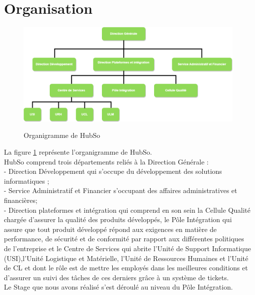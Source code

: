 \section{Organisation}
\begin{figure}[h!]
	\centering
	\begin{minipage}{18cm}
		\centering
		{\includegraphics[height=0.27\textheight]{fig/Organnigramme-HubSo.png}}
	\end{minipage}
 	\caption{Organigramme de HubSo}
 	\label{fig:1.1}
\end{figure}
La figure \ref{fig:1.1} représente l'organigramme de HubSo. \\
HubSo comprend trois départements reliés à la Direction Générale : \\
- Direction Développement qui s'occupe du développement des solutions informatiques ; \\
- Service Administratif et Financier s'occupant des affaires administratives et financières;\\
- Direction plateformes et intégration qui comprend en son sein la Cellule Qualité chargée d'assurer la qualité des produits développés, le Pôle Intégration qui assure que tout produit développé répond aux exigences en matière de performance, de sécurité et de conformité par rapport aux différentes politiques de l'entreprise et le Centre de Services qui abrite l'Unité de Support Informatique (USI),l'Unité Logistique et Matérielle, l'Unité de Ressources Humaines et l'Unité de CL et dont le rôle est de mettre les employés dans les meilleures conditions et d'assurer un suivi des tâches de ces derniers grâce à un système de tickets.\\
Le Stage que nous avons réalisé s'est déroulé au niveau du Pôle Intégration.
\clearpage
